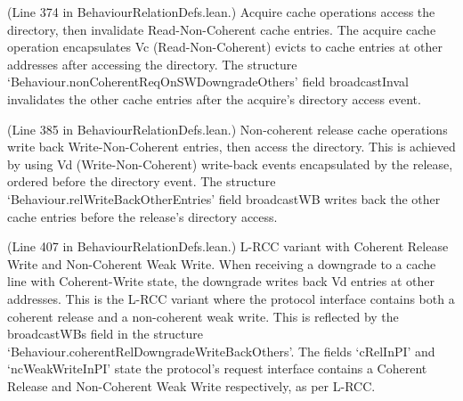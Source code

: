 \begin{definition}
  \label{def:acqInvalOtherEntries}
  \leanok
  (Line 374 in BehaviourRelationDefs.lean.)
  Acquire cache operations access the directory, then invalidate
  Read-Non-Coherent cache entries.
  The acquire cache operation encapsulates Vc (Read-Non-Coherent) evicts
  to cache entries at other addresses after accessing the directory.
  The structure `Behaviour.nonCoherentReqOnSWDowngradeOthers' field
  broadcastInval invalidates the other cache entries after the acquire's directory access
  event.
\end{definition}

\begin{definition}
  \label{def:relWriteBackOtherEntries}
  \leanok
  (Line 385 in BehaviourRelationDefs.lean.)
  Non-coherent release cache operations write back Write-Non-Coherent entries,
  then access the directory.
  This is achieved by using Vd (Write-Non-Coherent) write-back
  events encapsulated by the release, ordered before the directory event.
  The structure `Behaviour.relWriteBackOtherEntries' field broadcastWB writes back
  the other cache entries before the release's directory access.
\end{definition}

\begin{definition}
  \label{def:coherentRelDowngradeWriteBackOthers}
  \leanok
  (Line 407 in BehaviourRelationDefs.lean.)
  L-RCC variant with Coherent Release Write and Non-Coherent Weak Write.
  When receiving a downgrade to a cache line with Coherent-Write state,
  the downgrade writes back Vd entries at other addresses. This is the
  L-RCC variant where the protocol interface contains both a coherent
  release and a non-coherent weak write.
  This is reflected by the broadcastWBs field in the structure
  `Behaviour.coherentRelDowngradeWriteBackOthers'.
  The fields `cRelInPI' and `ncWeakWriteInPI' state the protocol's request
  interface contains a Coherent Release and Non-Coherent Weak Write respectively,
  as per L-RCC.
\end{definition}

